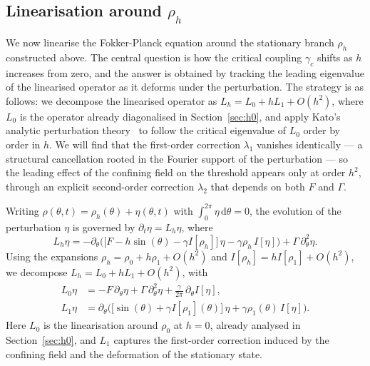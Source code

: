 \documentclass[a4paper,11pt]{article}
\theoremstyle{plain}
\theoremstyle{definition}
\theoremstyle{remark}
\newcommand{\dd}{\,\mathrm{d}}
\begin{document}
\subsection{Linearisation around $\rho_h$}\label{subsec:linearisation-h}
We now linearise the Fokker-Planck equation around the stationary branch $\rho_h$ constructed above. The central question is how the critical coupling $\gamma_c$ shifts as $h$ increases from zero, and the answer is obtained by tracking the leading eigenvalue of the linearised operator as it deforms under the perturbation. The strategy is as follows: we decompose the linearised operator as $L_h = L_0 + hL_1 + O(h^2)$, where $L_0$ is the operator already diagonalised in Section~\ref{sec:h0}, and apply Kato's analytic perturbation theory~\cite{kato1966perturbation} to follow the critical eigenvalue of $L_0$ order by order in $h$. We will find that the first-order correction $\lambda_1$ vanishes identically — a structural cancellation rooted in the Fourier support of the perturbation — so the leading effect of the confining field on the threshold appears only at order $h^2$, through an explicit second-order correction $\lambda_2$ that depends on both $F$ and $\Gamma$.

Writing $\rho(\theta,t) = \rho_h(\theta) + \eta(\theta,t)$ with $\int_0^{2\pi}\eta\dd\theta = 0$, the evolution of the perturbation $\eta$ is governed by $\partial_t \eta = L_h \eta$, where
\begin{equation}\label{eq:Lh-operator}
    L_h\eta = -\partial_\theta\Big(\big[F - h\sin(\theta)
    - \gamma I[\rho_h]\big]\,\eta
    - \gamma\rho_h\, I[\eta]\Big) + \Gamma\,\partial_\theta^2\eta.
\end{equation}
Using the expansions $\rho_h = \rho_0 + h\rho_1 + O(h^2)$ and $I[\rho_h] = hI[\rho_1] + O(h^2)$, we decompose $L_h = L_0 + hL_1 + O(h^2)$, with
\begin{align}
    L_0\eta &= -F\,\partial_\theta\eta + \Gamma\,\partial_\theta^2\eta
    + \frac{\gamma}{2\pi}\,\partial_\theta I[\eta], \label{eq:L0-def}\\
    L_1\eta &= \partial_\theta\Big(
    \big[\sin(\theta) + \gamma I[\rho_1](\theta)\big]\,\eta
    + \gamma\rho_1(\theta)\, I[\eta]\Big). \label{eq:L1-def}
\end{align}
Here $L_0$ is the linearisation around $\rho_0$ at $h = 0$, already analysed in Section~\ref{sec:h0}, and $L_1$ captures the first-order correction induced by the confining field and the deformation of the stationary state.
\end{document}
